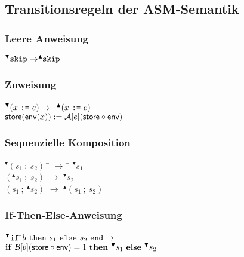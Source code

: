 \documentclass[german,10pt, a4paper, twocolumn]{scrartcl}
\theoremstyle{definition}
\theoremstyle{remark}
\begin{document}
\subsection{Transitionsregeln der ASM-Semantik}

\subsubsection{Leere Anweisung}
\small
$^{\blacktriangledown}\mbox{\tt skip} \rightarrow  ^{\blacktriangle}\!\!\mbox{\tt skip}$
\normalsize

\subsubsection{Zuweisung}
\small
\begin{tabbing}
$^{\blacktriangledown}(x\ \mbox{\tt :=}\ e) \rightarrow$ \= 	$^{\blacktriangle}(x\ \mbox{\tt :=}\ e)$ \\
\>								$\mbox{\sffamily store}(\mbox{\sffamily env}(x)) := \mathcal{A}[e](\mbox{\sffamily store}\circ\mbox{\sffamily env})$
\end{tabbing}
\normalsize

\subsubsection{Sequenzielle Komposition}
\small
\begin{tabbing}
 $^{\blacktriangledown}(s_1\ ;\ s_2)\:$ \=		$\rightarrow\:$ \=	$^{\blacktriangledown}s_1$\\
 $(^{\blacktriangle}s_1\ ;\ s_2)$ \>			$\rightarrow$ \>	$^{\blacktriangledown}s_2$\\
 $(s_1\ ;\ ^{\blacktriangle}s_2)$ \>			$\rightarrow$ \>	$^{\blacktriangle}(s_1\ ;\ s_2)$
\end{tabbing}
\normalsize

\subsubsection{If-Then-Else-Anweisung}
\small
\begin{tabbing}
 $^{\blacktriangledown} \mbox{\tt if}\ $\=$b\ \mbox{\tt then}\ s_1\ \mbox{\tt else}\ s_2\ \mbox{\tt end} \rightarrow$\\
 \>	$\mbox{\textbf{if}}\ \mathcal{B}[b](\mbox{\sffamily store} \circ \mbox{\sffamily env}) = 1\ \mbox{\textbf{then}}\ ^{\blacktriangledown} s_1\ \mbox{\textbf{else}}\ ^{\blacktriangledown} s_2$
\end{tabbing}
\end{document}
